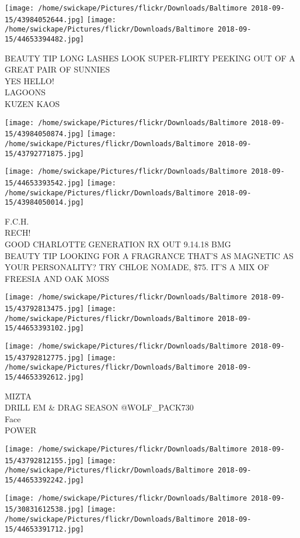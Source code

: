 \documentclass[10pt,letterpaper]{article}
\begin{document}
\texttt{[image: /home/swickape/Pictures/flickr/Downloads/Baltimore 2018-09-15/43984052644.jpg]}
\texttt{[image: /home/swickape/Pictures/flickr/Downloads/Baltimore 2018-09-15/44653394482.jpg]}

BEAUTY TIP LONG LASHES LOOK SUPER{-}FLIRTY PEEKING OUT OF A GREAT PAIR OF SUNNIES\\
YES HELLO!\\
LAGOONS\\
KUZEN KAOS
\pagebreak

\texttt{[image: /home/swickape/Pictures/flickr/Downloads/Baltimore 2018-09-15/43984050874.jpg]}
\texttt{[image: /home/swickape/Pictures/flickr/Downloads/Baltimore 2018-09-15/43792771875.jpg]}

\texttt{[image: /home/swickape/Pictures/flickr/Downloads/Baltimore 2018-09-15/44653393542.jpg]}
\texttt{[image: /home/swickape/Pictures/flickr/Downloads/Baltimore 2018-09-15/43984050014.jpg]}

F.C.H.\\
RECH!\\
GOOD CHARLOTTE GENERATION RX OUT 9.14.18 BMG\\
BEAUTY TIP LOOKING FOR A FRAGRANCE THAT'S AS MAGNETIC AS YOUR PERSONALITY?  TRY CHLOE NOMADE, \$75.  IT'S A MIX OF FREESIA AND OAK MOSS
\pagebreak

\texttt{[image: /home/swickape/Pictures/flickr/Downloads/Baltimore 2018-09-15/43792813475.jpg]}
\texttt{[image: /home/swickape/Pictures/flickr/Downloads/Baltimore 2018-09-15/44653393102.jpg]}

\texttt{[image: /home/swickape/Pictures/flickr/Downloads/Baltimore 2018-09-15/43792812775.jpg]}
\texttt{[image: /home/swickape/Pictures/flickr/Downloads/Baltimore 2018-09-15/44653392612.jpg]}

MIZTA\\
DRILL EM \& DRAG SEASON @WOLF\_PACK730\\
Face\\
POWER
\pagebreak

\texttt{[image: /home/swickape/Pictures/flickr/Downloads/Baltimore 2018-09-15/43792812155.jpg]}
\texttt{[image: /home/swickape/Pictures/flickr/Downloads/Baltimore 2018-09-15/44653392242.jpg]}

\texttt{[image: /home/swickape/Pictures/flickr/Downloads/Baltimore 2018-09-15/30831612538.jpg]}
\texttt{[image: /home/swickape/Pictures/flickr/Downloads/Baltimore 2018-09-15/44653391712.jpg]}
\end{document}
